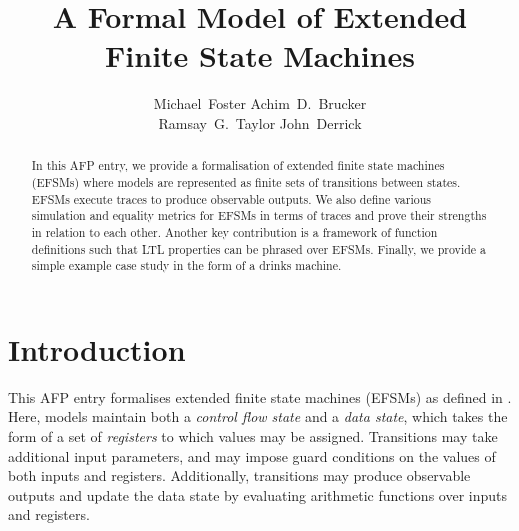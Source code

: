 \documentclass[10pt,DIV16,a4paper,abstract=true,twoside=semi,openright]{scrreprt}
\title{A Formal Model of Extended Finite State Machines}%
\author{%
\begin{minipage}{.8\textwidth}
  \centering
      Michael~Foster\footnotemark[1]\orcidID{0000-0001-8233-9873}%
      \qquad\qquad%
      Achim~D.~Brucker\footnotemark[2]\orcidID{0000-0002-6355-1200}%
      \\%
      Ramsay~G.~Taylor\footnotemark[1]\orcidID{0000-0002-4036-7590}%
      \qquad\qquad%
      John~Derrick\footnotemark[1]\orcidID{0000-0002-6631-8914}%
     \end{minipage}
}
\begin{document}
\maketitle
\begin{abstract}
  In this AFP entry, we provide a formalisation of extended finite state machines (EFSMs) where models are represented as finite sets of transitions between states. EFSMs execute traces to produce observable outputs. We also define various simulation and equality metrics for EFSMs in terms of traces and prove their strengths in relation to each other. Another key contribution is a framework of function definitions such that LTL properties can be phrased over EFSMs. Finally, we provide a simple example case study in the form of a drinks machine.
  \begin{quote}
    \bigskip
  \end{quote}
\end{abstract}


\tableofcontents
\cleardoublepage

\chapter{Introduction}
This AFP entry formalises extended finite state machines (EFSMs) as defined in \cite{foster2018}. Here, models maintain both a \emph{control flow state} and a \emph{data state}, which takes the form of a set of \emph{registers} to which values may be assigned. Transitions may take additional input parameters, and may impose guard conditions on the values of both inputs and registers. Additionally, transitions may produce observable outputs and update the data state by evaluating arithmetic functions over inputs and registers.
\end{document}

